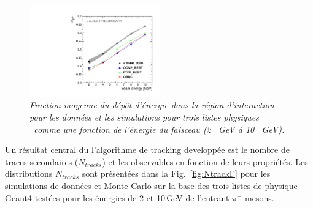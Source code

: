 \begin{figure}
	\centering
	\includegraphics[width=0.5\textwidth]{ECAL/plots/e-ir-graph.pdf}
	\caption{\label{fig:irgraphF} \sl  Fraction moyenne du dépôt d'énergie dans la région d'interaction pour les données et les simulations  pour trois listes physiques \geant\ comme une fonction de l'énergie du faisceau (2 \, GeV à 10 \, GeV).}
\end{figure}



Un résultat central du l'algorithme de tracking developp\'ee est le nombre de traces secondaires ($N_ {tracks}$) et les observables en fonction de leurs propriétés.
Les distributions $N_ {tracks}$ sont présentées dans la Fig.~\ref{fig:NtrackF} pour les simulations de données et Monte Carlo sur la base des trois listes de physique {\sc Geant4} testées pour les énergies de 2 et 10\,GeV de l'entrant $\pi^-$-mesons.

